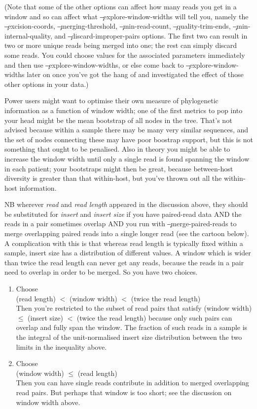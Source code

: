 (Note that some of the other options can affect how many reads you get in a window and so can affect what \c{--explore-window-widths} will tell you, namely the \c{--excision-coords}, \c{--merging-threshold}, \c{--min-read-count}, \c{--quality-trim-ends}, \c{--min-internal-quality}, and \c{--discard-improper-pairs} options.
The first two can result in two or more unique reads being merged into one; the rest can simply discard some reads.
You could choose values for the associated parameters immediately and then use \c{--explore-window-widths}, or else come back to \c{--explore-window-widths} later on once you've got the hang of \p and investigated the effect of those other options in your data.)  

Power users might want to optimise their own measure of phylogenetic information as a function of window width; one of the first metrics to pop into your head might be the mean bootstrap of all nodes in the tree.
That's not advised because within a sample there may be many very similar sequences, and the set of nodes connecting these may have poor boostrap support, but this is not something that ought to be penalised.
Also in theory you might be able to increase the window width until only a single read is found spanning the window in each patient; your bootstraps might then be great, because between-host diversity is greater than that within-host, but you've thrown out all the within-host information.

NB wherever {\it read} and {\it read length} appeared in the discussion above, they should be substituted for {\it insert} and {\it insert size} if you have paired-read data AND the reads in a pair sometimes overlap AND you run \p with \c{--merge-paired-reads} to merge overlapping paired reads into a single longer read (see the cartoon below).
A complication with this is that whereas read length is typically fixed within a sample, insert size has a distribution of different values.
A window which is wider than twice the read length can never get any reads, because the reads in a pair need to overlap in order to be merged.
So you have two choices.
\begin{enumerate}
 \item Choose\\  
(read length) $<$ (window width) $<$ (twice the read length)\\  
Then you're restricted to the subset of read pairs that satisfy  
(window width) $\leq$ (insert size) $<$ (twice the read length)  
because only such pairs can overlap and fully span the window.
The fraction of such reads in a sample is the integral of the unit-normalised insert size distribution between the two limits in the inequality above.
\item Choose\\  
(window width) $\leq$ (read length)\\  
Then you can have single reads contribute in addition to merged overlapping read pairs.
But perhaps that window is too short; see the discussion on window width above.
\end{enumerate}

